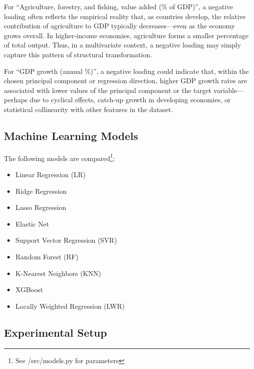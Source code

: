 \documentclass[12pt]{article}
\begin{document}
For “Agriculture, forestry, and fishing, value added (\% of GDP)”, a negative loading often reflects the empirical reality that, as countries develop, the relative contribution of agriculture to GDP typically decreases—even as the economy grows overall. In higher-income economies, agriculture forms a smaller percentage of total output. Thus, in a multivariate context, a negative loading may simply capture this pattern of structural transformation.

For “GDP growth (annual \%)”, a negative loading could indicate that, within the chosen principal component or regression direction, higher GDP growth rates are associated with lower values of the principal component or the target variable—perhaps due to cyclical effects, catch-up growth in developing economies, or statistical collinearity with other features in the dataset.





\subsection{Machine Learning Models}

The following models are compared\footnote{See /src/models.py for parameters}:
\begin{itemize}
    \item Linear Regression (LR)
    \item Ridge Regression
    \item Lasso Regression
    \item Elastic Net
    \item Support Vector Regression (SVR)
    \item Random Forest (RF)
    \item K-Nearest Neighbors (KNN)
    \item XGBoost
    \item Locally Weighted Regression (LWR)
\end{itemize}

\subsection{Experimental Setup}
\end{document}
